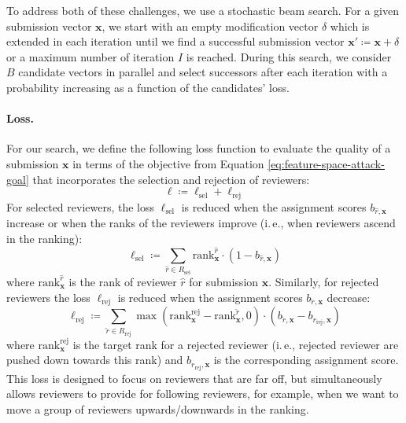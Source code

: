 \documentclass[letterpaper,twocolumn,10pt]{article}
\newcommand{\ie}{i.\,e.}
\newcommand{\bow}{\textbf{x}}
\newcommand{\submission}{\bow}
\newcommand{\reviewersubset}{R}
\newcommand{\reviewer}{r}
\newcommand{\select}{\text{sel}}
\newcommand{\reject}{\text{rej}}
\newcommand{\requestedreviewers}{\reviewersubset_{\select}}
\newcommand{\rejectedreviewers}{\reviewersubset_{\reject}}
\newcommand{\bid}{b}
\newcommand{\loss}{\ell}
\newcommand{\maxitr}{I}
\newcommand{\modifications}{\delta}
\begin{document}
To address both of these challenges, we use a stochastic beam search. For a given submission vector $\submission$, we start with an empty modification vector $\modifications$ which is extended in each iteration until we find a successful submission vector $\submission' \coloneqq \submission + \modifications$ or a maximum number of iteration $\maxitr$ is reached. During this search, we consider $B$ candidate vectors in parallel and select successors after each iteration with a probability increasing as a function of the candidates' loss. 

\paragraph{Loss.}
For our search, we define the following loss function to evaluate the quality of a submission $\submission$ in terms of the objective from Equation \ref{eq:feature-space-attack-goal} that incorporates the selection and rejection of reviewers:
\begin{equation}
    \loss \coloneqq \loss_{\select} + \loss_{\reject}
\end{equation}
For selected reviewers, the loss $\loss_{\select}$ is reduced when the assignment scores $\bid_{\hat{\reviewer}, \submission}$ increase or when the ranks of the reviewers improve (\ie{}, when reviewers ascend in the ranking):
\begin{equation}
\loss_{\select} \coloneqq \sum_{\hat{\reviewer} \in \requestedreviewers}{\text{rank}_\submission^{\hat{\reviewer}} \cdot (1 - \bid_{\hat{\reviewer}, \submission})}
\end{equation}
where $\text{rank}_\submission^{\hat{\reviewer}}$ is the rank of reviewer $\hat{\reviewer}$ for submission $\submission$.
Similarly, for rejected reviewers the loss $\loss_{\reject}$ is reduced when the assignment scores $\bid_{\check{\reviewer}, \submission}$ decrease:
\begin{equation}
\loss_{\reject} \coloneqq \sum_{\check{\reviewer} \in \rejectedreviewers}{\max(\text{rank}^{\reject}_{\submission} - \text{rank}_\submission^{\check{\reviewer}}, 0) \cdot (\bid_{\check{\reviewer}, \submission} - \bid_{\reviewer_{\reject}, \submission})}
\end{equation}
where $\text{rank}^{\reject}_{\submission}$ is the target rank for a rejected reviewer (\ie{}, rejected reviewer are pushed down towards this rank) and $\bid_{\reviewer_{\reject}, \submission}$ is the corresponding assignment score.
This loss is designed to focus on reviewers that are far off, but simultaneously allows reviewers to provide  for following reviewers, for example, when we want to move a group of reviewers upwards/downwards in the ranking.
\end{document}
